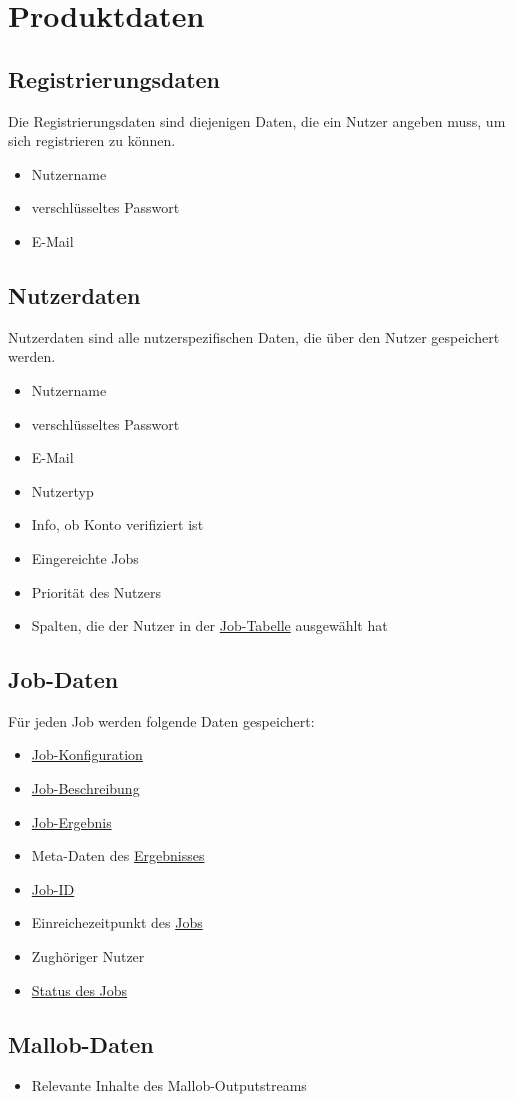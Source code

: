 
\section{Produktdaten}
\label{PD}

\label{PD:Registrierungsdaten}
\subsection{Registrierungsdaten}
Die Registrierungsdaten sind diejenigen Daten, die ein Nutzer angeben muss, um sich registrieren zu können. 
\begin{itemize}[noitemsep]
    \item Nutzername
    \item verschlüsseltes Passwort
    \item E-Mail
\end{itemize}

\label{PD:Nutzerdaten}
\subsection{Nutzerdaten}
Nutzerdaten sind alle nutzerspezifischen Daten, die über den Nutzer gespeichert werden.
\begin{itemize}[noitemsep]
    \item Nutzername
    \item verschlüsseltes Passwort
    \item E-Mail
    \item Nutzertyp
    \item Info, ob Konto verifiziert ist
    \item Eingereichte Jobs 
    \item Priorität des Nutzers
    \item Spalten, die der Nutzer in der \hyperref[pages:job-table]{Job-Tabelle} ausgewählt hat
\end{itemize}



\subsection{Job-Daten}
Für jeden Job werden folgende Daten gespeichert:
\begin{itemize}[noitemsep]
    \item \hyperref[B:Job-Konfiguration]{Job-Konfiguration}
    \item \hyperref[B:Job-Beschreibung]{Job-Beschreibung}
    \item \hyperref[B:Job-Ergebnis]{Job-Ergebnis}
    \item Meta-Daten des \hyperref[B:Job-Ergebnis]{Ergebnisses}
    \item \hyperref[B:Job-ID]{Job-ID}
    \item Einreichezeitpunkt des \hyperref[B:Jobs]{Jobs}
    \item Zughöriger Nutzer
    \item \hyperref[B:Job-Status]{Status des Jobs}
\end{itemize}

\subsection{\gls{Mallob}-Daten}
\begin{itemize}
    \item Relevante Inhalte des \gls{Mallob}-Outputstreams
\end{itemize}
